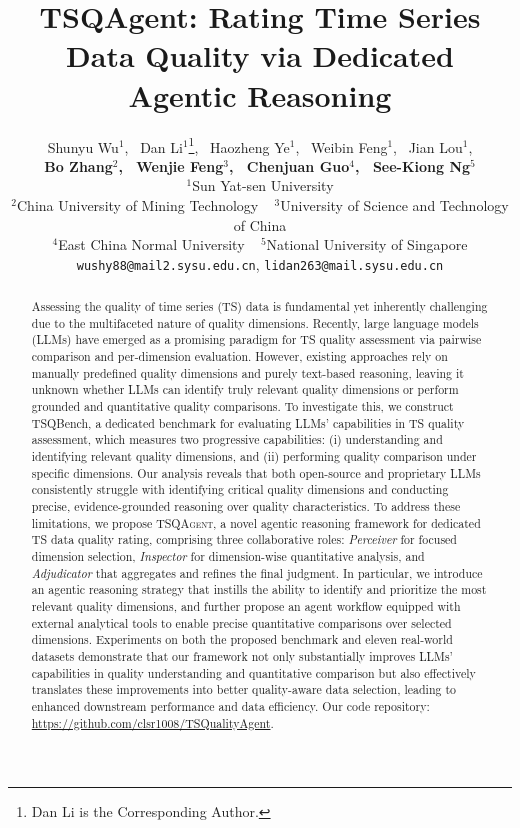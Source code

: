 \documentclass{article}
\title{TSQAgent: Rating Time Series Data Quality via Dedicated Agentic Reasoning}
\author{
Shunyu Wu$^{1}$, \ Dan Li$^{1}$\thanks{Dan Li is the Corresponding Author.}, \ Haozheng Ye$^{1}$, \ Weibin Feng$^{1}$, \ Jian Lou$^{1}$, \\{\bfseries Bo Zhang$^{2}$, \ Wenjie Feng$^{3}$,  \ Chenjuan Guo$^{4}$, \ See-Kiong Ng$^{5}$} \\
$^{1}$Sun Yat-sen University \\
$^{2}$China University of Mining Technology ~
$^{3}$University of Science and Technology of China \\
$^{4}$East China Normal University ~
$^{5}$National University of Singapore \\
\texttt{wushy88@mail2.sysu.edu.cn}, \texttt{lidan263@mail.sysu.edu.cn}
}
\begin{document}
\maketitle


\begin{abstract}
Assessing the quality of time series (TS) data is fundamental yet inherently challenging due to the multifaceted nature of quality dimensions. Recently, large language models (LLMs) have emerged as a promising paradigm for TS quality assessment via pairwise comparison and per-dimension evaluation. However, existing approaches rely on manually predefined quality dimensions and purely text-based reasoning, leaving it unknown whether LLMs can identify truly relevant quality dimensions or perform grounded and quantitative quality comparisons.
To investigate this, we construct TSQBench, a dedicated benchmark for evaluating LLMs' capabilities in TS quality assessment, which measures two progressive capabilities: (i) understanding and identifying relevant quality dimensions, and (ii) performing quality comparison under specific dimensions. Our analysis reveals that both open-source and proprietary LLMs consistently struggle with identifying critical quality dimensions and conducting precise, evidence-grounded reasoning over quality characteristics.
To address these limitations, we propose \textsc{TSQAgent}, a novel agentic reasoning framework for dedicated TS data quality rating, comprising three collaborative roles: \emph{Perceiver} for focused dimension selection, \emph{Inspector} for dimension-wise quantitative analysis, and \emph{Adjudicator} that aggregates and refines the final judgment. In particular, we introduce an agentic reasoning strategy that instills the ability to identify and prioritize the most relevant quality dimensions, and further propose an agent workflow equipped with external analytical tools to enable precise quantitative comparisons over selected dimensions.
Experiments on both the proposed benchmark and eleven real-world datasets demonstrate that our framework not only substantially improves LLMs' capabilities in quality understanding and quantitative comparison but also effectively translates these improvements into better quality-aware data selection, leading to enhanced downstream performance and data efficiency. Our code repository: \url{https://github.com/clsr1008/TSQualityAgent}. 
\end{abstract}
\end{document}
